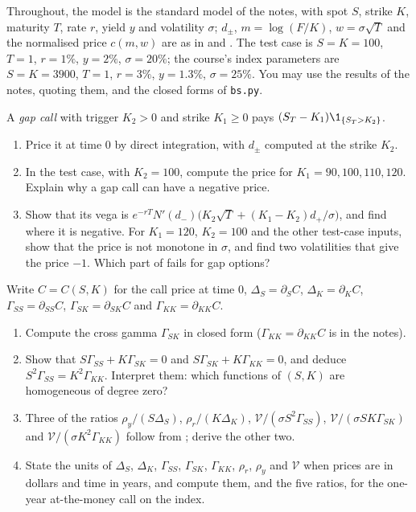 Throughout, the model is the standard model of the notes, with spot $S$, strike $K$, maturity $T$, rate
$r$, yield $y$ and volatility $\sigma$; $d_\pm$, $m=\log(F/K)$, $w=\sigma\sqrt T$ and the normalised price
$c(m,w)$ are as in  and . The test case is $S=K=100$, $T=1$,
$r=1\%$, $y=2\%$, $\sigma=20\%$; the course's index parameters are $S=K=3900$, $T=1$, $r=3\%$, $y=1.3\%$,
$\sigma=25\%$. You may use the results of the notes, quoting them, and the closed forms of
\texttt{bs.py}.

\begin{exercise}\label{ex:bsf-gap}
\easy A \emph{gap call} with trigger $K_2>0$ and strike $K_1\ge0$ pays $(S_T-K_1)\1_{\{S_T>K_2\}}$.
\begin{enumerate}[label=(\alph*)]
  \item Price it at time $0$ by direct integration, with $d_\pm$ computed at the strike $K_2$.
  \item In the test case, with $K_2=100$, compute the price for $K_1=90,100,110,120$. Explain why a gap call
    can have a negative price.
  \item Show that its vega is $e^{-rT}N'(d_-)\big(K_2\sqrt T+(K_1-K_2)d_+/\sigma\big)$, and find where it is
    negative. For $K_1=120$, $K_2=100$ and the other test-case inputs, show that the price is not monotone
    in $\sigma$, and find two volatilities that give the price $-1$. Which part of
     fails for gap options?
\end{enumerate}
\end{exercise}

\begin{exercise}\label{ex:bsf-strike-greeks}
\easy Write $C=C(S,K)$ for the call price at time $0$, $\Delta_S=\partial_SC$, $\Delta_K=\partial_KC$,
$\Gamma_{SS}=\partial_{SS}C$, $\Gamma_{SK}=\partial_{SK}C$ and $\Gamma_{KK}=\partial_{KK}C$.
\begin{enumerate}[label=(\alph*)]
  \item Compute the cross gamma $\Gamma_{SK}$ in closed form ($\Gamma_{KK}=\partial_{KK}C$ is in the notes).
  \item Show that $S\Gamma_{SS}+K\Gamma_{SK}=0$ and $S\Gamma_{SK}+K\Gamma_{KK}=0$, and deduce
    $S^2\Gamma_{SS}=K^2\Gamma_{KK}$. Interpret them: which functions of $(S,K)$ are homogeneous of degree
    zero?
  \item Three of the ratios $\rho_y/(S\Delta_S)$, $\rho_r/(K\Delta_K)$, $\mathcal V/(\sigma S^2\Gamma_{SS})$,
    $\mathcal V/(\sigma SK\Gamma_{SK})$ and $\mathcal V/(\sigma K^2\Gamma_{KK})$ follow from
    ; derive the other two.
  \item State the units of $\Delta_S$, $\Delta_K$, $\Gamma_{SS}$, $\Gamma_{SK}$, $\Gamma_{KK}$, $\rho_r$, $\rho_y$
    and $\mathcal V$ when prices are in dollars and time in years, and compute them, and the five ratios, for
    the one-year at-the-money call on the index.
\end{enumerate}
\end{exercise}

